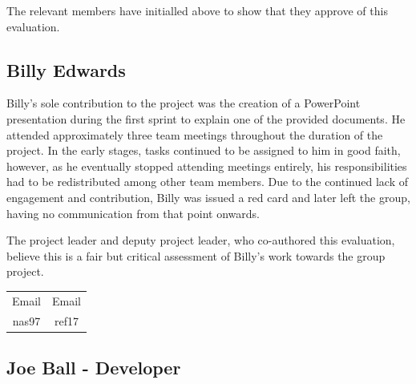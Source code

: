 \documentclass[a4paper]{project}
\begin{document}
			The relevant members have initialled above to show that they approve of this evaluation.
		
		\subsection{Billy Edwards}\label{subsec:performance-billy-edwards}
		
			Billy’s sole contribution to the project was the creation of a PowerPoint presentation during the first sprint to explain one of the provided documents. He attended approximately three team meetings throughout the duration of the project. In the early stages, tasks continued to be assigned to him in good faith, however, as he eventually stopped attending meetings entirely, his responsibilities had to be redistributed among other team members. Due to the continued lack of engagement and contribution, Billy was issued a red card and later left the group, having no communication from that point onwards.
			
			The project leader and deputy project leader, who co-authored this evaluation, believe this is a fair but critical assessment of Billy's work towards the group project.
			
			\begin{center}
				\setlength{\tabcolsep}{0.1\paperwidth}
				\begin{tabular}{c c}
					Email & Email \\
					nas97 & ref17
				\end{tabular}
			\end{center}
		
		\subsection{Joe Ball - Developer}\label{subsec:performance-joe-ball}
		
\end{document}
